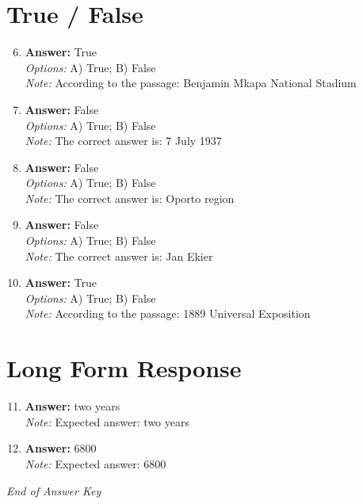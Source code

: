 \documentclass[12pt]{article}
\begin{document}
\section*{True / False}
\begin{enumerate}[label=\arabic*.]
\setcounter{enumi}{5}
\item \textbf{Answer:} True
\\ \textit{Options:} A) True; B) False
\\ \textit{Note:} According to the passage: Benjamin Mkapa National Stadium
\item \textbf{Answer:} False
\\ \textit{Options:} A) True; B) False
\\ \textit{Note:} The correct answer is: 7 July 1937
\item \textbf{Answer:} False
\\ \textit{Options:} A) True; B) False
\\ \textit{Note:} The correct answer is: Oporto region
\item \textbf{Answer:} False
\\ \textit{Options:} A) True; B) False
\\ \textit{Note:} The correct answer is: Jan Ekier
\item \textbf{Answer:} True
\\ \textit{Options:} A) True; B) False
\\ \textit{Note:} According to the passage: 1889 Universal Exposition
\end{enumerate}

\section*{Long Form Response}
\begin{enumerate}[label=\arabic*.]
\setcounter{enumi}{10}
\item \textbf{Answer:} two years
\\ \textit{Note:} Expected answer: two years
\item \textbf{Answer:} 6800
\\ \textit{Note:} Expected answer: 6800
\end{enumerate}

\vfill
\noindent\textit{End of Answer Key}
\end{document}
